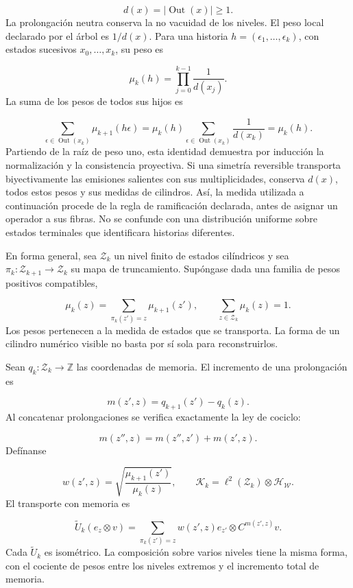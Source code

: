 \[
d(x)=|\operatorname{Out}(x)|\geq1.
\]
La prolongación neutra conserva la no vacuidad de los niveles. El peso local declarado por el árbol es \(1/d(x)\). Para una historia \(h=(\epsilon_1,\ldots,\epsilon_k)\), con estados sucesivos \(x_0,\ldots,x_k\), su peso es

\[
\mu_k(h)=\prod_{j=0}^{k-1}\frac1{d(x_j)}.
\]
La suma de los pesos de todos sus hijos es

\[
\sum_{\epsilon\in\operatorname{Out}(x_k)}
\mu_{k+1}(h\epsilon)
=\mu_k(h)\sum_{\epsilon\in\operatorname{Out}(x_k)}\frac1{d(x_k)}
=\mu_k(h).
\]
Partiendo de la raíz de peso uno, esta identidad demuestra por inducción la normalización y la consistencia proyectiva. Si una simetría reversible transporta biyectivamente las emisiones salientes con sus multiplicidades, conserva \(d(x)\), todos estos pesos y sus medidas de cilindros. Así, la medida utilizada a continuación procede de la regla de ramificación declarada, antes de asignar un operador a sus fibras. No se confunde con una distribución uniforme sobre estados terminales que identificara historias diferentes.

En forma general, sea \(\mathcal Z_k\) un nivel finito de estados cilíndricos y sea \(\pi_k:\mathcal Z_{k+1}\to\mathcal Z_k\) su mapa de truncamiento. Supóngase dada una familia de pesos positivos compatibles,

\[
\mu_k(z)=\sum_{\pi_k(z')=z}\mu_{k+1}(z'),
\qquad \sum_{z\in\mathcal Z_k}\mu_k(z)=1.
\]
Los pesos pertenecen a la medida de estados que se transporta. La forma de un cilindro numérico visible no basta por sí sola para reconstruirlos.

Sean \(q_k:\mathcal Z_k\to\mathbb Z\) las coordenadas de memoria. El incremento de una prolongación es

\[
m(z',z)=q_{k+1}(z')-q_k(z).
\]
Al concatenar prolongaciones se verifica exactamente la ley de cociclo:

\[
m(z'',z)=m(z'',z')+m(z',z).
\]
Defínanse

\[
w(z',z)=
\sqrt{\frac{\mu_{k+1}(z')}{\mu_k(z)}},
\qquad
\mathcal K_k=\ell^2(\mathcal Z_k)\otimes\mathcal H_{\mathscr W}.
\]
El transporte con memoria es

\[
\widetilde U_k(e_z\otimes v)
=\sum_{\pi_k(z')=z}w(z',z)e_{z'}\otimes C^{m(z',z)}v.
\]
Cada \(\widetilde U_k\) es isométrico. La composición sobre varios niveles tiene la misma forma, con el cociente de pesos entre los niveles extremos y el incremento total de memoria.

